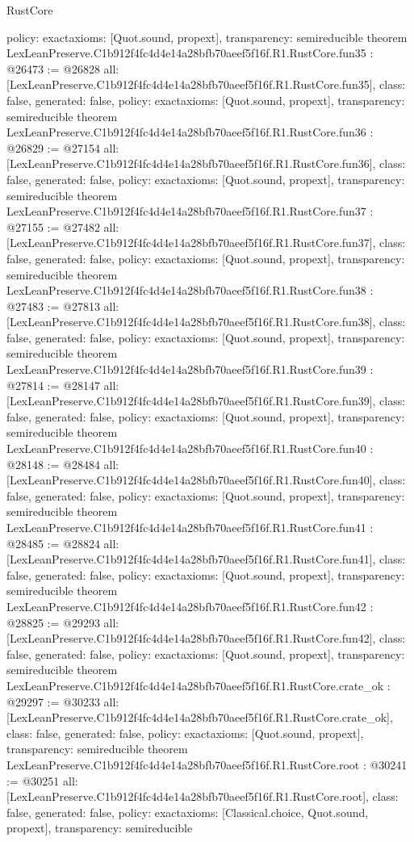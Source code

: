 \begin{lexlean}{RustCore}
\begin{coremodule}
{  policy: exact{axioms: [Quot.sound, propext]},
  transparency: semireducible
}
theorem LexLeanPreserve.C1b912f4fc4d4e14a28bfb70aeef5f16f.R1.RustCore.fun35 : @26473 := @26828 {
  all: [LexLeanPreserve.C1b912f4fc4d4e14a28bfb70aeef5f16f.R1.RustCore.fun35],
  class: false,
  generated: false,
  policy: exact{axioms: [Quot.sound, propext]},
  transparency: semireducible
}
theorem LexLeanPreserve.C1b912f4fc4d4e14a28bfb70aeef5f16f.R1.RustCore.fun36 : @26829 := @27154 {
  all: [LexLeanPreserve.C1b912f4fc4d4e14a28bfb70aeef5f16f.R1.RustCore.fun36],
  class: false,
  generated: false,
  policy: exact{axioms: [Quot.sound, propext]},
  transparency: semireducible
}
theorem LexLeanPreserve.C1b912f4fc4d4e14a28bfb70aeef5f16f.R1.RustCore.fun37 : @27155 := @27482 {
  all: [LexLeanPreserve.C1b912f4fc4d4e14a28bfb70aeef5f16f.R1.RustCore.fun37],
  class: false,
  generated: false,
  policy: exact{axioms: [Quot.sound, propext]},
  transparency: semireducible
}
theorem LexLeanPreserve.C1b912f4fc4d4e14a28bfb70aeef5f16f.R1.RustCore.fun38 : @27483 := @27813 {
  all: [LexLeanPreserve.C1b912f4fc4d4e14a28bfb70aeef5f16f.R1.RustCore.fun38],
  class: false,
  generated: false,
  policy: exact{axioms: [Quot.sound, propext]},
  transparency: semireducible
}
theorem LexLeanPreserve.C1b912f4fc4d4e14a28bfb70aeef5f16f.R1.RustCore.fun39 : @27814 := @28147 {
  all: [LexLeanPreserve.C1b912f4fc4d4e14a28bfb70aeef5f16f.R1.RustCore.fun39],
  class: false,
  generated: false,
  policy: exact{axioms: [Quot.sound, propext]},
  transparency: semireducible
}
theorem LexLeanPreserve.C1b912f4fc4d4e14a28bfb70aeef5f16f.R1.RustCore.fun40 : @28148 := @28484 {
  all: [LexLeanPreserve.C1b912f4fc4d4e14a28bfb70aeef5f16f.R1.RustCore.fun40],
  class: false,
  generated: false,
  policy: exact{axioms: [Quot.sound, propext]},
  transparency: semireducible
}
theorem LexLeanPreserve.C1b912f4fc4d4e14a28bfb70aeef5f16f.R1.RustCore.fun41 : @28485 := @28824 {
  all: [LexLeanPreserve.C1b912f4fc4d4e14a28bfb70aeef5f16f.R1.RustCore.fun41],
  class: false,
  generated: false,
  policy: exact{axioms: [Quot.sound, propext]},
  transparency: semireducible
}
theorem LexLeanPreserve.C1b912f4fc4d4e14a28bfb70aeef5f16f.R1.RustCore.fun42 : @28825 := @29293 {
  all: [LexLeanPreserve.C1b912f4fc4d4e14a28bfb70aeef5f16f.R1.RustCore.fun42],
  class: false,
  generated: false,
  policy: exact{axioms: [Quot.sound, propext]},
  transparency: semireducible
}
theorem LexLeanPreserve.C1b912f4fc4d4e14a28bfb70aeef5f16f.R1.RustCore.crate_ok : @29297 := @30233 {
  all: [LexLeanPreserve.C1b912f4fc4d4e14a28bfb70aeef5f16f.R1.RustCore.crate_ok],
  class: false,
  generated: false,
  policy: exact{axioms: [Quot.sound, propext]},
  transparency: semireducible
}
theorem LexLeanPreserve.C1b912f4fc4d4e14a28bfb70aeef5f16f.R1.RustCore.root : @30241 := @30251 {
  all: [LexLeanPreserve.C1b912f4fc4d4e14a28bfb70aeef5f16f.R1.RustCore.root],
  class: false,
  generated: false,
  policy: exact{axioms: [Classical.choice, Quot.sound, propext]},
  transparency: semireducible
}


\end{coremodule}
\end{lexlean}
